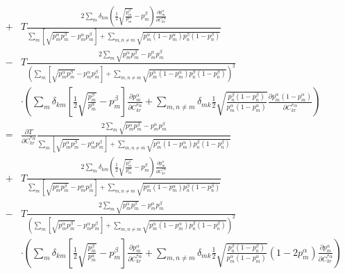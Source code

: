 \documentclass[pra,nofootinbib]{revtex4-1}
\begin{document}
\begin{eqnarray}
       \nonumber \\
   &+& T
       \frac{2\sum_{m}\delta_{km}\left(\frac{1}{2}
             \sqrt{\frac{p^\beta_m}{p^\alpha_m}}-p^\beta_m\right)
             \frac{\partial p^\alpha_m}{\partial C^{*\alpha}_{kr}}}
            { \sum_{m}\left[\sqrt{p^\alpha_m p^\beta_m}-p^\alpha_m p^\beta_m\right]
             +\sum_{m,n\ne m}\sqrt{p^\alpha_m(1-p^\alpha_m)p^\beta_n(1-p^\beta_n)}}
       \nonumber \\
   &-& T
       \frac{2\sum_{m}\sqrt{p^\alpha_m p^\beta_m}-p^\alpha_m p^\beta_m}
            {\left(
                 \sum_{m}\left[\sqrt{p^\alpha_m p^\beta_m}-p^\alpha_m p^\beta_m\right]
                +\sum_{m,n\ne m}\sqrt{p^\alpha_m(1-p^\alpha_m)p^\beta_n(1-p^\beta_n)}
             \right)^2} \nonumber \\
   &&  \cdot\left(
       \sum_{m}\delta_{km}\left[\frac{1}{2}
       \sqrt{\frac{p^\beta_m}{p^\alpha_m}}-p^\beta_m\right]
       \frac{\partial p^\alpha_m}{\partial C^{*\alpha}_{kr}}
       +\sum_{m,n\ne m}\delta_{mk}\frac{1}{2}
       \sqrt{\frac{p^\beta_n(1-p^\beta_n)}{p^\alpha_m(1-p^\alpha_m)}}
       \frac{\partial p^\alpha_m(1-p^\alpha_m)}
            {\partial C^{*\alpha}_{kr}}
       \right) \\
   &=& \frac{\partial T}{\partial C^{*\alpha}_{kr}}
       \frac{2\sum_{m}\sqrt{p^\alpha_m p^\beta_m}-p^\alpha_m p^\beta_m}
            { \sum_{m}\left[\sqrt{p^\alpha_m p^\beta_m}-p^\alpha_m p^\beta_m\right]
             +\sum_{m,n\ne m}\sqrt{p^\alpha_m(1-p^\alpha_m)p^\beta_n(1-p^\beta_n)}}
       \nonumber \\
   &+& T
       \frac{2\sum_{m}\delta_{km}\left(\frac{1}{2}
             \sqrt{\frac{p^\beta_m}{p^\alpha_m}}-p^\beta_m\right)
             \frac{\partial p^\alpha_m}{\partial C^{*\alpha}_{kr}}}
            { \sum_{m}\left[\sqrt{p^\alpha_m p^\beta_m}-p^\alpha_m p^\beta_m\right]
             +\sum_{m,n\ne m}\sqrt{p^\alpha_m(1-p^\alpha_m)p^\beta_n(1-p^\beta_n)}}
       \nonumber \\
   &-& T
       \frac{2\sum_{m}\sqrt{p^\alpha_m p^\beta_m}-p^\alpha_m p^\beta_m}
            {\left(
                 \sum_{m}\left[\sqrt{p^\alpha_m p^\beta_m}-p^\alpha_m p^\beta_m\right]
                +\sum_{m,n\ne m}\sqrt{p^\alpha_m(1-p^\alpha_m)p^\beta_n(1-p^\beta_n)}
             \right)^2} \nonumber \\
   &&  \cdot\left(
       \sum_{m}\delta_{km}\left[\frac{1}{2}
       \sqrt{\frac{p^\beta_m}{p^\alpha_m}}-p^\beta_m\right]
       \frac{\partial p^\alpha_m}{\partial C^{*\alpha}_{kr}}
       +\sum_{m,n\ne m}\delta_{mk}\frac{1}{2}
       \sqrt{\frac{p^\beta_n(1-p^\beta_n)}{p^\alpha_m(1-p^\alpha_m)}}
       (1-2p^\alpha_m)
       \frac{\partial p^\alpha_m}{\partial C^{*\alpha}_{kr}}
       \right)
       \\
\end{eqnarray}
\end{document}
